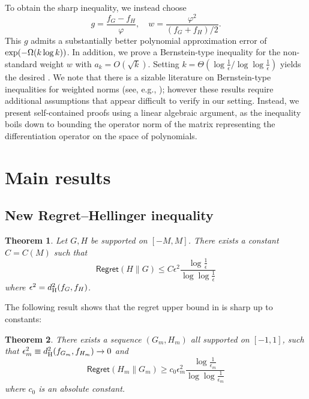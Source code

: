 \documentclass[letterpaper,11pt]{article}
\def\exp{\mathop{\rm exp}}
\newcommand{\hellinger}{d_{\rm H}}
\newtheorem{theorem}{Theorem}
\theoremstyle{definition}
\newcommand{\Regret}{\mathsf{Regret}}
\begin{document}
To obtain the sharp inequality, we instead choose 
\[
g = \frac{f_G-f_H}{\varphi}, \quad w=  \frac{\varphi^2}{(f_G+f_H)/2}.
\]
This $g$ admits a substantially better polynomial approximation error of $\exp(-\Omega(k
\log k))$. In addition, we prove a Bernstein-type inequality 
 for the non-standard weight $w$ with $a_k = O(\sqrt{k})$.
Setting 
$k =\Theta(\log \frac{1}{\epsilon}/ \log\log \frac{1}{\epsilon})$
yields the desired .
We note that there is a sizable literature on Bernstein-type inequalities for weighted
norms (see, e.g., \cite{LevinLubinsky2001,lubinsky2007survey}); however these results
require additional assumptions that appear difficult to verify in our setting. Instead, we
present self-contained proofs using a linear algebraic argument, as the inequality  boils down to bounding the operator norm of the matrix representing the differentiation operator on the space of polynomials.




\section{Main results}

\subsection{New Regret--Hellinger inequality}






\begin{theorem}
  \label{thm:ub-compact-intro}
  Let $G,H$ be supported on $[-M,M]$.
  There exists a constant $C=C(M)$ such that
  \[
    \Regret(H\|G)
    \leq
    C   \epsilon^2 \frac{\log \frac{1}{\epsilon}}{\log \log \frac{1}{\epsilon}}
  \]
  where $\epsilon^2 = \hellinger^2(f_{G},f_{H})$.
\end{theorem}




The following result shows that the regret upper bound in  is sharp up to constants:
\begin{theorem}
      There exists a sequence $(G_m,H_m)$ all supported on $[-1,1]$, such that
      $\epsilon_m^2 \equiv \hellinger^2(f_{G_m},f_{H_m}) \to 0$ and
      \[
        \Regret(H_m\|G_m)
        \geq
        c_0 \epsilon_m^2 \frac{\log \frac{1}{\epsilon_m}}{\log \log \frac{1}{\epsilon_m}}
      \]
      where $c_0$ is an absolute constant.
      \label{thm:lb}
    \end{theorem}
\end{document}
